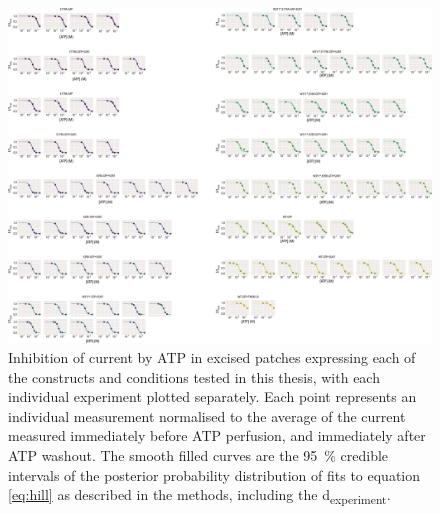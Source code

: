 \begin{figure}[h]
	\centering
	\includegraphics[width=\textwidth]{all_atp_fits_2.pdf}
	\caption[ATP inhibition sample hill fits]{
	Inhibition of current by ATP in excised patches expressing each of the constructs and conditions tested in this thesis, with each individual experiment plotted separately.
	Each point represents an individual measurement normalised to the average of the current measured immediately before ATP perfusion, and immediately after ATP washout.
	The smooth filled curves are the \SI{95}{\percent} credible intervals of the posterior probability distribution of fits to equation \ref{eq:hill} as described in the methods, including the \textgreek{d}\textsubscript{experiment}.
	}
	\label{apxfig:atp_inhib_2}
\end{figure}

